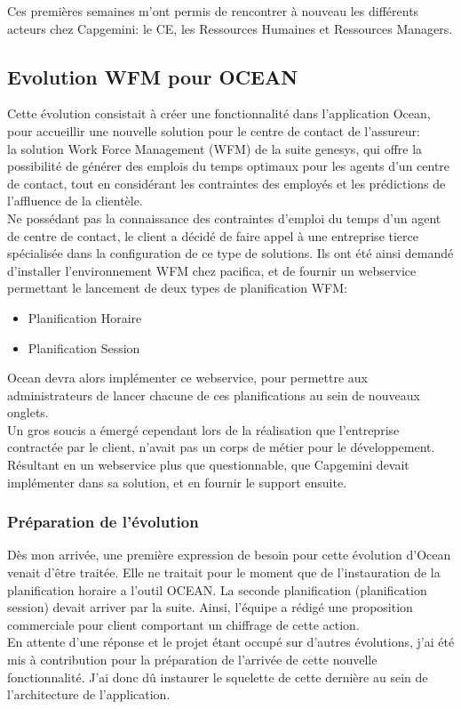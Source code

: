 \documentclass{rapport}
\begin{document}
Ces premières semaines m'ont permis de rencontrer à nouveau les différents acteurs chez Capgemini: le CE, les Ressources Humaines et Ressources Managers.\\ 

\newpage
\subsection{Evolution WFM pour OCEAN}

Cette évolution consistait à créer une fonctionnalité dans l'application Ocean, pour accueillir une nouvelle solution pour le centre de contact de l'assureur: \\
la solution Work Force Management (WFM) de la suite genesys, qui offre la possibilité de générer des emplois du temps optimaux pour les agents d'un centre de contact, tout en considérant les contraintes des employés et les prédictions de l'affluence de la clientèle.\\

Ne possédant pas la connaissance des contraintes d'emploi du temps d'un agent de centre de contact, le client a décidé de faire appel à une entreprise tierce spécialisée dans la configuration de ce type de solutions. Ils ont été ainsi demandé d'installer l'environnement WFM chez pacifica, et de fournir un webservice permettant le lancement de deux types de planification WFM:
\begin{itemize}
  \item Planification Horaire
  \item Planification Session
\end{itemize}

Ocean devra alors implémenter ce webservice, pour permettre aux administrateurs de lancer chacune de ces planifications au sein de nouveaux onglets.\\

Un gros soucis a émergé cependant lors de la réalisation que l'entreprise contractée par le client, n'avait pas un corps de métier pour le développement. Résultant en un webservice plus que questionnable, que Capgemini devait implémenter dans sa solution, et en fournir le support ensuite.

\subsubsection{Préparation de l'évolution}

Dès mon arrivée, une première expression de besoin pour cette évolution d'Ocean venait d'être traitée. Elle ne traitait pour le moment que de l'instauration de la planification horaire a l'outil OCEAN. La seconde planification (planification session) devait arriver par la suite. Ainsi, l'équipe a rédigé une proposition commerciale pour client comportant un chiffrage de cette action.\\
En attente d'une réponse et le projet étant occupé sur d'autres évolutions, j'ai été mis à contribution pour la préparation de l'arrivée de cette nouvelle fonctionnalité. J'ai donc dû instaurer le squelette de cette dernière au sein de l'architecture de l'application.\\
\end{document}
